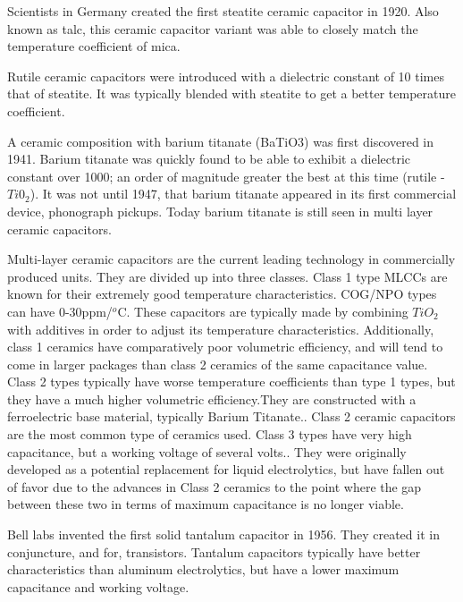 \noindent Scientists in Germany created the first steatite ceramic capacitor in 1920. \cite[Ch 3 Sec II]{cerMaterials} \cite{cerDie} Also known as talc, this ceramic capacitor variant was able to closely match the temperature coefficient of mica.\cite{steatite_hf}     

\noindent Rutile ceramic capacitors were introduced with a dielectric constant of 10 times that of steatite. It was typically blended with steatite to get a better temperature coefficient. 

\noindent A ceramic composition with barium titanate (BaTiO3) was first discovered in 1941. Barium titanate was quickly found to be able to exhibit a dielectric constant over 1000; an order of magnitude greater the best at this time (rutile - $Ti0_2$). It was not until 1947, that barium titanate appeared in its first commercial device, phonograph pickups.\cite{piezCer}\cite{hist_cerFilt}\cite[Ch 3 Sec III]{cerMaterials} Today barium titanate is still seen in multi layer ceramic capacitors.

\noindent Multi-layer ceramic capacitors are the current leading technology in commercially produced units. They are divided up into three classes. Class 1 type MLCCs are known for their extremely good temperature characteristics. COG/NPO types can have 0-30ppm/$^o$C. These capacitors are typically made by combining $TiO_2$ with additives in order to adjust its temperature characteristics\cite{intro_cerCaps}. Additionally, class 1 ceramics have comparatively poor volumetric efficiency, and will tend to come in larger packages than class 2 ceramics of the same capacitance value. Class 2 types typically have worse temperature coefficients than type 1 types, but they have a much higher volumetric efficiency.They are constructed with a ferroelectric base material, typically Barium Titanate.\cite{intro_cerCaps}. Class 2 ceramic capacitors are the most common type of ceramics used. Class 3 types have very high capacitance, but a working voltage of several volts.\cite{hist_cerFilt}\cite[Ch 3 Sec VI]{cerMaterials}\cite{atCer_tempco}. They were originally developed as a potential replacement for liquid electrolytics, but have fallen out of favor due to the advances in Class 2 ceramics to the point where the gap between these two in terms of maximum capacitance is no longer viable\cite{wiki_cer}.

\noindent Bell labs invented the first solid tantalum capacitor in 1956. They created it in conjuncture, and for, transistors.\cite[f.~56-64]{dumInv} Tantalum capacitors typically have better characteristics than aluminum electrolytics, but have a lower maximum capacitance and working voltage.\cite{learn_caps}

